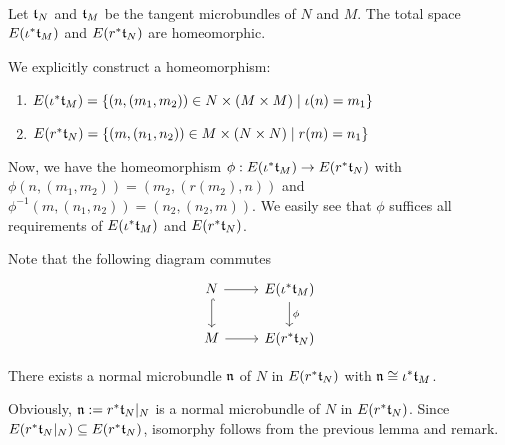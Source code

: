  \\
Let $\mathfrak{t}_N$ and $\mathfrak{t}_M$ be the tangent microbundles of $N$ and $M$.
The total space $E(\iota^*\mathfrak{t}_M)$ and $E(r^*\mathfrak{t}_N)$ are homeomorphic.
\begin{myproof}
We explicitly construct a homeomorphism:
\begin{enumerate}
    \item $E(\iota^*\mathfrak{t}_M) = \{ (n, (m_1, m_2)) \in N \times (M \times M) \mid \iota(n) = m_1\}$
    \item $E(r^*\mathfrak{t}_N) = \{ (m, (n_1, n_2)) \in M \times (N \times N) \mid r(m) = n_1\}$
\end{enumerate}
Now, we have the homeomorphism $\phi: E(\iota^*\mathfrak{t}_M) \to E(r^*\mathfrak{t}_N)$ with
$\phi(n, (m_1, m_2)) = (m_2, (r(m_2), n))$ and $\phi^{-1}(m, (n_1, n_2)) = (n_2, (n_2, m))$.
We easily see that $\phi$ suffices all requirements of $E(\iota^*\mathfrak{t}_M)$ and $E(r^*\mathfrak{t}_N)$.
\end{myproof}

\begin{remark}
Note that the following diagram commutes
\[\begin{tikzcd}
    N \ar[r] \ar[hookrightarrow]{d} & E(\iota^*\bt_M) \ar[d, "\phi"] \\
    M \ar[r] & E(r^*\bt_N)
\end{tikzcd}\]
\end{remark}

There exists a normal microbundle $\mathfrak{n}$ of $N$ in $E(r^*\mathfrak{t}_N)$ with $\mathfrak{n} \cong \iota^*\mathfrak{t}_M$.
\begin{myproof}
Obviously, $\mathfrak{n} := r^*\mathfrak{t}_N \vert_{N}$ is a normal microbundle of $N$ in $E(r^*\mathfrak{t}_N)$.
Since $E(r^*\mathfrak{t}_N \vert_{N}) \subseteq{} E(r^*\mathfrak{t}_N)$, isomorphy follows from the previous lemma and remark.
\end{myproof}